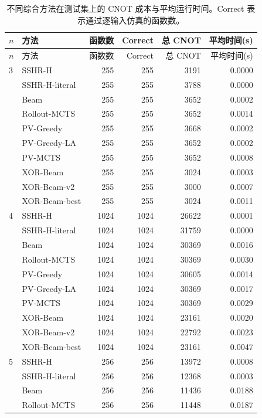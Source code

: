 \begin{center}
\scriptsize
\begin{longtable}{llrrrr}
\caption{不同综合方法在测试集上的 CNOT 成本与平均运行时间。Correct 表示通过逐输入仿真的函数数。}
\label{tab:main-results}\\
\toprule
$n$ & 方法 & 函数数 & Correct & 总 CNOT & 平均时间(s) \\
\midrule
\endfirsthead
\toprule
$n$ & 方法 & 函数数 & Correct & 总 CNOT & 平均时间(s) \\
\midrule
\endhead
3 & SSHR-H & 255 & 255 & 3191 & 0.0000 \\
 & SSHR-H-literal & 255 & 255 & 3788 & 0.0000 \\
 & Beam & 255 & 255 & 3652 & 0.0002 \\
 & Rollout-MCTS & 255 & 255 & 3652 & 0.0014 \\
 & PV-Greedy & 255 & 255 & 3668 & 0.0002 \\
 & PV-Greedy-LA & 255 & 255 & 3652 & 0.0002 \\
 & PV-MCTS & 255 & 255 & 3652 & 0.0008 \\
 & XOR-Beam & 255 & 255 & 3024 & 0.0003 \\
 & XOR-Beam-v2 & 255 & 255 & 3000 & 0.0007 \\
 & XOR-Beam-best & 255 & 255 & 3024 & 0.0011 \\
\midrule
4 & SSHR-H & 1024 & 1024 & 26622 & 0.0001 \\
 & SSHR-H-literal & 1024 & 1024 & 31759 & 0.0000 \\
 & Beam & 1024 & 1024 & 30369 & 0.0016 \\
 & Rollout-MCTS & 1024 & 1024 & 30369 & 0.0030 \\
 & PV-Greedy & 1024 & 1024 & 30605 & 0.0014 \\
 & PV-Greedy-LA & 1024 & 1024 & 30369 & 0.0017 \\
 & PV-MCTS & 1024 & 1024 & 30369 & 0.0029 \\
 & XOR-Beam & 1024 & 1024 & 23161 & 0.0020 \\
 & XOR-Beam-v2 & 1024 & 1024 & 22792 & 0.0023 \\
 & XOR-Beam-best & 1024 & 1024 & 23161 & 0.0047 \\
\midrule
5 & SSHR-H & 256 & 256 & 13972 & 0.0008 \\
 & SSHR-H-literal & 256 & 256 & 12368 & 0.0003 \\
 & Beam & 256 & 256 & 11436 & 0.0188 \\
 & Rollout-MCTS & 256 & 256 & 11448 & 0.0187 \\

\end{longtable}
\end{center}
